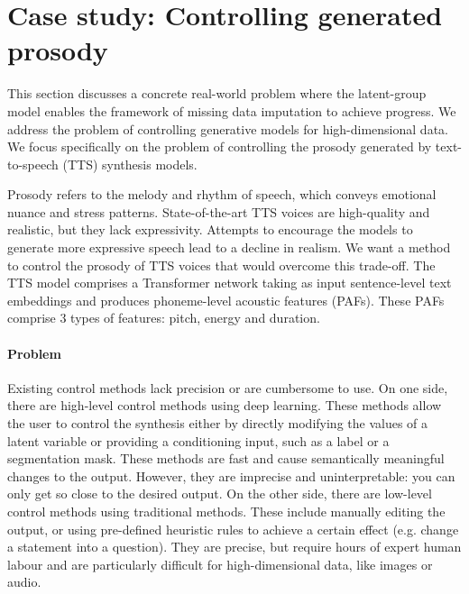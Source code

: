 \documentclass[a4paper,12pt,twoside,openright]{report}
\begin{document}
\section{Case study: Controlling generated prosody}

This section discusses a concrete real-world problem where the latent-group model enables the framework of missing data imputation to achieve progress. We address the problem of controlling generative models for high-dimensional data. We focus specifically on the problem of controlling the prosody generated by text-to-speech (TTS) synthesis models. 

Prosody refers to the melody and rhythm of speech, which conveys emotional nuance and stress patterns. State-of-the-art TTS voices are high-quality and realistic, but they lack expressivity. Attempts to encourage the models to generate more expressive speech lead to a decline in realism. We want a method to control the prosody of TTS voices that would overcome this trade-off. The TTS model comprises a Transformer network taking as input sentence-level text embeddings and produces phoneme-level acoustic features (PAFs). These PAFs comprise 3 types of features: pitch, energy and duration.

\paragraph{Problem} Existing control methods lack precision or are cumbersome to use. On one side, there are high-level control methods using deep learning. These methods allow the user to control the synthesis either by directly modifying the values of a latent variable or providing a conditioning input, such as a label or a segmentation mask. These methods are fast and cause semantically meaningful changes to the output. However, they are imprecise and uninterpretable: you can only get so close to the desired output. On the other side, there are low-level control methods using traditional methods. These include manually editing the output, or using pre-defined heuristic rules to achieve a certain effect (e.g. change a statement into a question). They are precise, but require hours of expert human labour and are particularly difficult for high-dimensional data, like images or audio.
\end{document}
